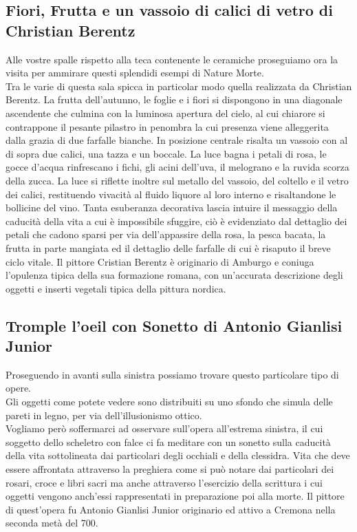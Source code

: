 \documentclass[hidelinks,12pt,a4paper]{article}
\begin{document}
\begin{flushleft}
		\subsection{Fiori, Frutta e un vassoio di calici di vetro di Christian Berentz}
		Alle vostre spalle rispetto alla teca contenente le ceramiche proseguiamo ora la visita per ammirare questi splendidi esempi di Nature Morte.\\
		Tra le varie di questa sala spicca in particolar modo quella realizzata da Christian Berentz. La frutta dell'autunno, le foglie e i fiori si dispongono in una diagonale ascendente che culmina con la luminosa apertura del cielo, al cui chiarore si contrappone il pesante pilastro in penombra la cui presenza viene alleggerita dalla grazia di due farfalle bianche. In posizione centrale risalta un vassoio con al di sopra due calici, una tazza e un boccale. La luce bagna i petali di rosa, le gocce d'acqua rinfrescano i fichi, gli acini dell'uva, il melograno e la ruvida scorza della  zucca. La luce si riflette inoltre sul metallo del vassoio, del coltello e il vetro dei calici, restituendo vivacità al fluido liquore al loro interno e risaltandone le bollicine del vino. Tanta esuberanza decorativa lascia intuire il messaggio della caducità della vita a cui è impossibile sfuggire, ciò è evidenziato dal dettaglio dei petali che cadono sparsi per via dell'appassire della rosa, la pesca bacata, la frutta in parte mangiata ed il dettaglio delle farfalle di cui è risaputo il breve ciclo vitale. Il pittore Cristian Berentz è originario di Amburgo e coniuga l'opulenza tipica della sua formazione romana, con un'accurata descrizione degli oggetti e inserti vegetali tipica della pittura nordica.
		
		\subsection{Tromple l'oeil con Sonetto di Antonio Gianlisi Junior}
		Proseguendo in avanti sulla sinistra possiamo trovare questo particolare tipo di opere.\\
		Gli oggetti come potete vedere sono distribuiti su uno sfondo che simula delle pareti in legno, per via dell'illusionismo ottico.\\
		Vogliamo però soffermarci ad osservare sull'opera all'estrema sinistra, il cui soggetto dello scheletro con falce ci fa meditare con un sonetto sulla caducità della vita sottolineata dai particolari degli occhiali e della clessidra. Vita che deve essere affrontata attraverso la preghiera come si può notare dai particolari dei rosari, croce e libri sacri ma anche attraverso l'esercizio della scrittura i cui oggetti vengono anch'essi rappresentati in preparazione poi alla morte. Il pittore di quest'opera fu Antonio Gianlisi Junior originario ed attivo a Cremona nella seconda metà del 700.
		

\end{flushleft}
\end{document}
